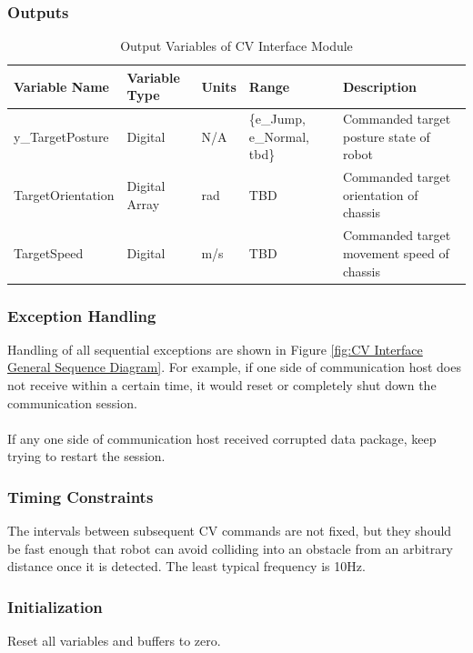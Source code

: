 \documentclass[12pt]{article}
\begin{document}
        \subsubsection{Outputs}
            \begin{table}[H]
              \centering
                \caption{Output Variables of CV Interface Module} \label{tbl:Output Variables of CV Interface Module}
                \begin{tabularx}{\textwidth}{|p{4cm}|p{1.5cm}|p{1.2cm}|p{1.6cm}|X|}
                \hline Variable Name & Variable Type & Units & Range & Description \\
                \hline y\_TargetPosture & Digital & N/A &\{e\_Jump, e\_Normal, \acrshort{tbd}\} & Commanded target posture state of robot  \\
                \hline TargetOrientation & Digital Array  & \unit{\radian}  &TBD& Commanded target orientation of chassis\\
                \hline TargetSpeed         & Digital  & m/s  &TBD& Commanded target movement speed of chassis\\
                \hline 
              \end{tabularx}
            \end{table}  
        \subsubsection{Exception Handling}
            Handling of all sequential exceptions are shown in Figure \ref{fig:CV Interface General Sequence Diagram}. For example, if one side of communication host does not receive within a certain time, it would reset or completely shut down the communication session.\\\\
            If any one side of communication host received corrupted data package, keep trying to restart the session.
        \subsubsection{Timing Constraints}
            The intervals between subsequent CV commands are not fixed, but they should be fast enough that robot can avoid colliding into an obstacle from an arbitrary distance once it is detected. The least typical frequency is 10Hz.
        \subsubsection{Initialization}
            Reset all variables and buffers to zero.
\end{document}
